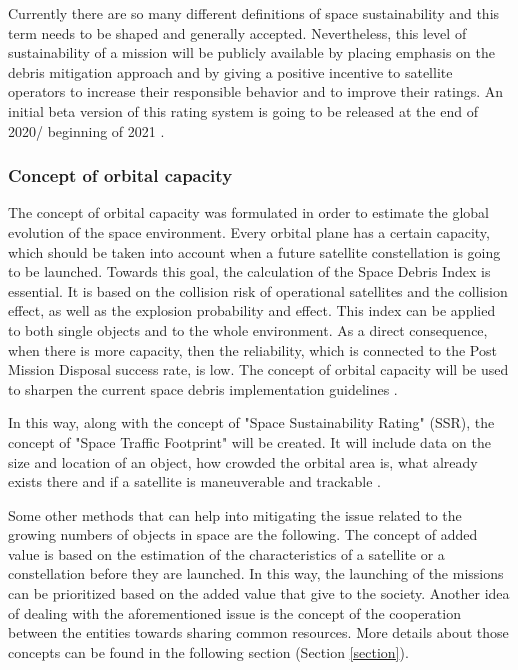 Currently there are so many different definitions of space sustainability and this term needs to be shaped and generally accepted. Nevertheless, this level of sustainability of a mission will be publicly available by placing emphasis on the debris mitigation approach and by giving a positive incentive to satellite operators to increase their responsible behavior and to improve their ratings. An initial beta version of this rating system is going to be released at the end of 2020/ beginning of 2021 \cite{Space sustainability}.

\bigskip
\subsubsection{Concept of orbital capacity}
\bigskip

The concept of orbital capacity was formulated in order to estimate the global evolution of the space environment. Every orbital plane has a certain capacity, which should be taken into account when a future satellite constellation is going to be launched. Towards this goal, the calculation of the Space Debris Index is essential. It is based on the collision risk of operational satellites and the collision effect, as well as the explosion probability and effect. This index can be applied to both single objects and to the whole environment. As a direct consequence, when there is more capacity, then the reliability, which is connected to the Post Mission Disposal success rate, is low. The concept of orbital capacity will be used to sharpen the current space debris implementation guidelines \cite{Letizia 2019}.

In this way, along with the concept of "Space Sustainability Rating" (SSR), the concept of "Space Traffic Footprint" will be created. It will include data on the size and location of an object, how crowded the orbital area is, what already exists there and if a satellite is maneuverable and trackable \cite{Space sustainability}.

\bigskip
Some other methods that can help into mitigating the issue related to the growing numbers of objects in space are the following. The concept of added value is based on the estimation of the characteristics of a satellite or a constellation before they are launched. In this way, the launching of the missions can be prioritized based on the added value that give to the society. Another idea of dealing with the aforementioned issue is the concept of the cooperation between the entities towards sharing common resources. More details about those concepts can be found in the following section (Section \ref{section}).


